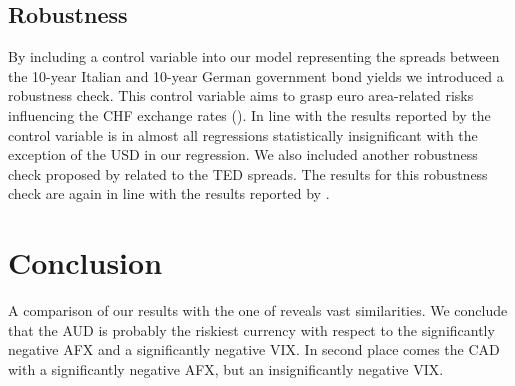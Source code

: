 \documentclass[a4paper,11pt,oneside]{article}
\begin{document}
\newpage
\subsection{Robustness}
By including a control variable into our model representing the spreads between the 10-year Italian and 10-year German government bond yields we introduced a robustness check. This control variable aims to grasp euro area-related risks influencing the CHF exchange rates (\cite{Grisse and Nitschka 2015}). In line with the results reported by \cite{Grisse and Nitschka 2015} the control variable is in almost all regressions statistically insignificant with the exception of the USD in our regression. We also included another robustness check proposed by \cite{Brunnermeier and Nagel and Pedersen 2009} related to the TED spreads. The results for this robustness check are again in line with the results reported by \cite{Grisse and Nitschka 2015}.\par  


\section{Conclusion}\label{Conclusion}
A comparison of our results with the one of \cite{Grisse and Nitschka 2015} reveals vast similarities. We conclude that the AUD is probably the riskiest currency with respect to the significantly negative AFX and a significantly negative VIX. In second place comes the CAD with a significantly negative AFX, but an insignificantly negative VIX.\par 
\end{document}
